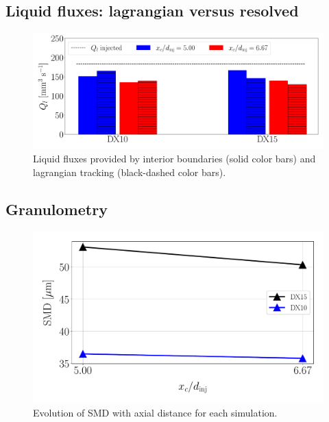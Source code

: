 \subsection{Liquid fluxes: lagrangian versus resolved}
\label{subsec:ch8_sli_fluxes_vs_IBs}



\begin{figure}[ht]
	\centering
   \includegraphics[scale=0.25]{./part3_applications/figures_ch8_resolved/SPRAY_characterization/establishment_and_fluxes/fluxes_SLI_vs_IBs}
   \caption{Liquid fluxes provided by interior boundaries (solid color bars) and lagrangian tracking (black-dashed color bars).}
   \label{fig:ch8_fluxes_bargraph_IBs_vs_LGS}
\end{figure}


\subsection{Granulometry}
\label{ch8:subsec_spray_char_granulo}


\begin{figure}[ht]
\centering
   \includegraphics[scale=0.40]{./part3_applications/figures_ch8_resolved/SPRAY_characterization/SMD_values}
   \vspace*{-0.2in}
   \caption{Evolution of SMD with axial distance for each simulation.}
   \label{fig:ch8_spray_char_SMD_final}
\end{figure}


